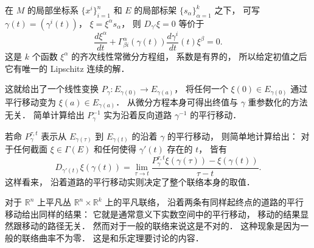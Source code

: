 在 $M$ 的局部坐标系 $\{x^i\}_{i=1}^n$ 和 $E$ 的局部标架 $\{s_{\alpha}\}_{\alpha=1}^k$ 之下， 可写 $\gamma(t)=(\gamma^i(t))$， $\xi=\xi^\alpha s_\alpha$， 则 $D_{\gamma'}\xi=0$ 等价于
$$
\frac{d\xi^\alpha}{dt}+\Gamma_{\beta i}^\alpha(\gamma(t))\frac{d\gamma^i}{dt}(t)\xi^\beta=0.
$$
这是 $k$ 个函数 $\xi^\alpha$ 的齐次线性常微分方程组， 系数是有界的， 所以给定初值之后它有唯一的 Lipschitz 连续的解． 

这就给出了一个线性变换 $P_{\gamma}:E_{\gamma(0)}\to E_{\gamma(a)}$， 将任何一个 $\xi(0)\in E_{\gamma(0)}$ 通过平行移动变为 $\xi(a)\in E_{\gamma(a)}$． 从微分方程本身可得出终值与 $\gamma$ 重参数化的方法无关． 简单计算给出 $P_\gamma^{-1}$ 实为沿着反向道路 $\gamma^{-1}$ 的平行移动． 

若命 $P_\gamma^{\tau,t}$ 表示从 $E_{\gamma(\tau)}$ 到 $E_{\gamma(t)}$ 的沿着 $\gamma$ 的平行移动， 则简单地计算给出： 对于任何截面 $\xi\in\Gamma(E)$ 和任何使得 $\gamma'(t)$ 存在的 $t$， 皆有
$$
D_{\gamma'(t)}\xi(\gamma(t))=\lim_{\tau\to t}\frac{P_\gamma^{\tau,t}\xi(\gamma(\tau))-\xi(\gamma(t))}{\tau-t}.
$$
这样看来， 沿着道路的平行移动实则决定了整个联络本身的取值．

对于 $\mathbb{R}^n$ 上平凡丛 $\mathbb{R}^n\times\mathbb{R}^k$ 上的平凡联络， 沿着两条有同样起终点的道路的平行移动给出同样的结果： 它就是通常意义下实数空间中的平行移动， 移动的结果显然跟移动的路径无关． 然而对于一般的联络来说这是不对的． 这种现象是因为一般的联络曲率不为零． 这是和乐定理要讨论的内容．
